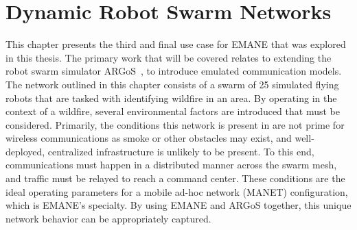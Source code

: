\chapter{Dynamic Robot Swarm Networks}
\label{chapter5}
This chapter presents the third and final use case for EMANE that was explored in this thesis.
The primary work that will be covered relates to extending the robot swarm simulator ARGoS~\cite{argos}, to introduce emulated communication models.
The network outlined in this chapter consists of a swarm of 25 simulated flying robots that are tasked with identifying wildfire in an area.
By operating in the context of a wildfire, several environmental factors are introduced that must be considered.
Primarily, the conditions this network is present in are not prime for wireless communications as smoke or other obstacles may exist, and well-deployed, centralized infrastructure is unlikely to be present.
To this end, communications must happen in a distributed manner across the swarm mesh, and traffic must be relayed to reach a command center.
These conditions are the ideal operating parameters for a mobile ad-hoc network (MANET) configuration, which is EMANE's specialty.
By using EMANE and ARGoS together, this unique network behavior can be appropriately captured.

